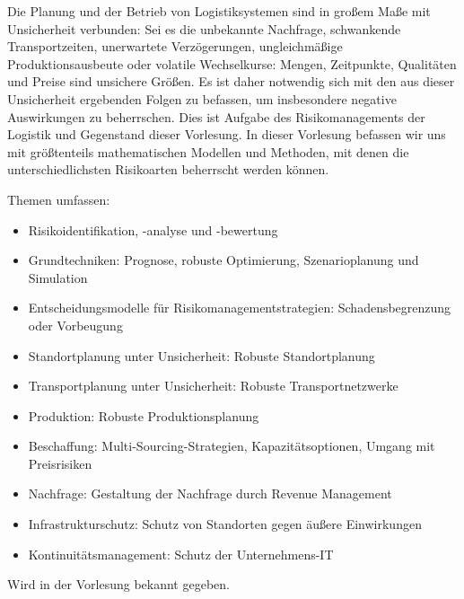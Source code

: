 \begin{course}
\begin{content}
Die Planung und der Betrieb von Logistiksystemen sind in großem Maße mit Unsicherheit verbunden: Sei es die unbekannte Nachfrage, schwankende Transportzeiten, unerwartete Verzögerungen, ungleichmäßige Produktionsausbeute oder volatile Wechselkurse: Mengen, Zeitpunkte, Qualitäten und Preise sind unsichere Größen. Es ist daher notwendig sich mit den aus dieser Unsicherheit ergebenden Folgen zu befassen, um insbesondere negative Auswirkungen zu beherrschen. Dies ist Aufgabe des Risikomanagements der Logistik und Gegenstand dieser Vorlesung.\newline
\newline
 In dieser Vorlesung befassen wir uns mit größtenteils mathematischen Modellen und Methoden, mit denen die unterschiedlichsten Risikoarten beherrscht werden können.

 

Themen umfassen:

 \begin{itemize}\item Risikoidentifikation, -analyse und -bewertung  \item Grundtechniken: Prognose, robuste Optimierung, Szenarioplanung und Simulation  \item Entscheidungsmodelle für Risikomanagementstrategien: Schadensbegrenzung oder Vorbeugung  \item Standortplanung unter Unsicherheit: Robuste Standortplanung  \item Transportplanung unter Unsicherheit: Robuste Transportnetzwerke  \item Produktion: Robuste Produktionsplanung  \item Beschaffung: Multi-Sourcing-Strategien, Kapazitätsoptionen, Umgang mit Preisrisiken  \item Nachfrage: Gestaltung der Nachfrage durch Revenue Management  \item Infrastrukturschutz: Schutz von Standorten gegen äußere Einwirkungen  \item Kontinuitätsmanagement: Schutz der Unternehmens-IT  \end{itemize}
\end{content}



\begin{literature}Wird in der Vorlesung bekannt gegeben.

\end{literature}



\end{course}